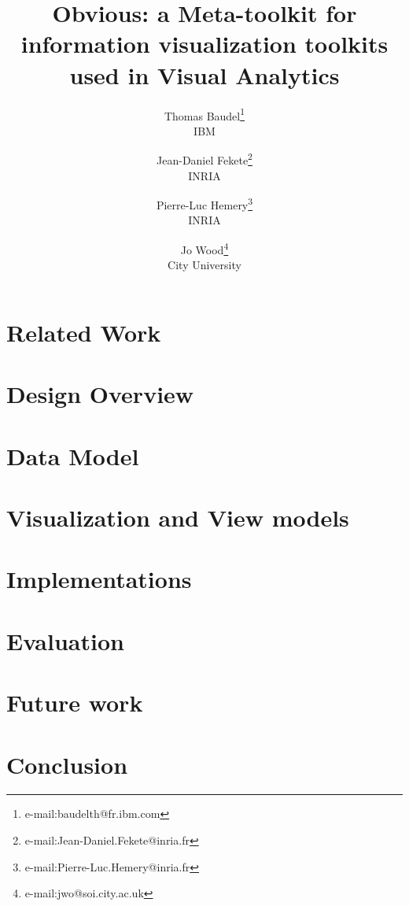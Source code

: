 \documentclass[electronic]{vgtc}             %
\title{Obvious: a Meta-toolkit for information visualization toolkits used in Visual Analytics}
\author{%
Thomas Baudel\thanks{e-mail:baudelth@fr.ibm.com}\\ %
  \scriptsize IBM %
\and Jean-Daniel Fekete\thanks{e-mail:Jean-Daniel.Fekete@inria.fr}\\ %
  \scriptsize INRIA %
\and Pierre-Luc Hemery\thanks{e-mail:Pierre-Luc.Hemery@inria.fr}\\ %
  \scriptsize INRIA %
\and Jo Wood\thanks{e-mail:jwo@soi.city.ac.uk}\\ %
   \scriptsize City University
}
\begin{document}

\maketitle



\section{Related Work}



\section{Design Overview}



\section{Data Model}



\section{Visualization and View models}



\section{Implementations}




\section{Evaluation}



\section{Future work}



\section{Conclusion}






\end{document}
